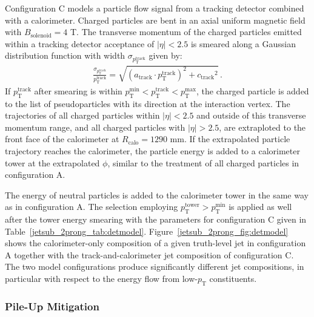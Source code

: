 \documentclass[11pt]{cernrep}
\begin{document}
Configuration C models a particle flow signal from a tracking detector combined with a calorimeter. 
Charged particles are bent in an axial uniform magnetic field with $B_{\text{solenoid}} = 4$ T.
The transverse momentum of the charged particles emitted within a tracking detector acceptance of $|\eta|<2.5$
is smeared along a Gaussian distribution function with width $\sigma_{\ensuremath{p_{\text{T}}^{\text{track}}}}$ given by:
\begin{align}
  \frac{\sigma_{\ensuremath{p_{\text{T}}^{\text{track}}}}}{\ensuremath{p_{\text{T}}^{\text{track}}}} = \sqrt{(\ensuremath{a_{\text{track}}}\cdot\ensuremath{p_{\text{T}}^{\text{track}}})^{2} + \ensuremath{c_{\text{track}}}^{2}}\,.
  \label{jetsub_2prong_eq:trkreso}
\end{align} 
If \ensuremath{p_{\text{T}}^{\text{track}}}{} after smearing is within $\ensuremath{p_{\text{T}}^{\text{min}}} < \ensuremath{p_{\text{T}}^{\text{track}}} < \ensuremath{p_{\text{T}}^{\text{max}}}$, the charged particle is added to the list of pseudoparticles with its direction at the interaction vertex. 
The trajectories of all charged particles within $|\eta| < 2.5$ and outside of this transverse momentum range, 
and all charged particles with $|\eta| > 2.5$, are extraploted to the front face of the calorimeter at $R_{\text{calo}} = 1290$ mm.
If the extrapolated particle trajectory reaches the calorimeter, the particle energy is added to a calorimeter tower at the extrapolated $\phi$, similar to the treatment of all charged particles in configuration A.

The energy of neutral particles is added to the calorimeter tower in the same way as in configuration A. 
The selection employing $\ensuremath{p_{\text{T}}^{\text{tower}}} > \ensuremath{p_{\text{T}}^{\text{min}}}$ is applied as well after the tower energy smearing with the parameters for configuration C given in Table~\ref{jetsub_2prong_tab:detmodel}. 
Figure~\ref{jetsub_2prong_fig:detmodel} shows the calorimeter-only composition of a given truth-level jet in configuration A together with the track-and-calorimeter jet composition of configuration C.
The two model configurations produce significantly different jet compositions, in particular with respect to the energy flow from low-\ensuremath{p_{\text{T}}}{} constituents.


\subsubsection{Pile-Up Mitigation}\label{jetsub_2prong_sec:pu_tech}
\end{document}
